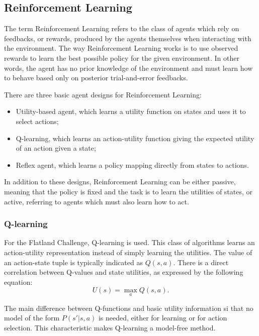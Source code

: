 \documentclass[a4paper, 12pt]{article}
\numberwithin{equation}{section}
\begin{document}
\subsection{Reinforcement Learning}\label{ch:reinforcement-learning}

The term Reinforcement Learning \cite{reinforcement-learning} refers to the class of agents which rely on feedbacks, or rewards, produced by the agents themselves when interacting with the environment. The way Reinforcement Learning works is to use observed rewards to learn the best possible policy for the given environment. In other words, the agent has no prior knowledge of the environment and must learn how to behave based only on posterior trial-and-error feedbacks.

There are three basic agent designs for Reinforcement Learning:
\begin{itemize}
	\item Utility-based agent, which learns a utility function on states and uses it to select actions;
	\item Q-learning, which learns an action-utility function giving the expected utility of an action given a state;
	\item Reflex agent, which learns a policy mapping directly from states to actions.
\end{itemize}

In addition to these designs, Reinforcement Learning can be either passive, meaning that the policy is fixed and the task is to learn the utilities of states, or active, referring to agents which must also learn how to act.

\subsubsection{Q-learning}

For the Flatland Challenge, Q-learning is used. This class of algorithms learns an action-utility representation instead of simply learning the utilities. The value of an action-state tuple is typically indicated as $Q\left(s,a\right)$. There is a direct correlation between Q-values and state utilities, as expressed by the following equation:
\begin{equation}
	U\left(s\right) = \max_a Q\left(s,a\right).
\end{equation}

The main difference between Q-functions and basic utility information si that no model of the form $P\left(s'|s,a\right)$ is needed, either for learning or for action selection. This characteristic makes Q-learning a model-free method.
\end{document}
